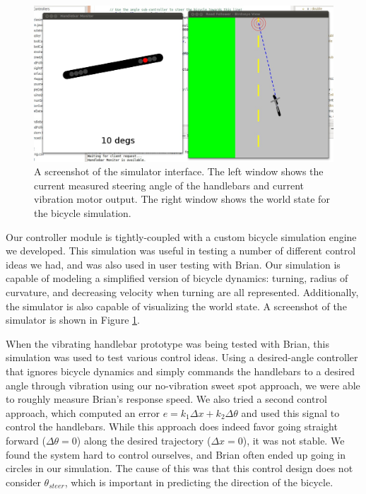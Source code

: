 \documentclass[aps,twocolumn,secnumarabic,balancelastpage,amsmath,amssymb,nofootinbib]{revtex4-1}
\begin{document}
\begin{figure}
\includegraphics[scale=0.18]{simulator_screenshot.jpg}
\caption{A screenshot of the simulator interface. The left window shows the current measured steering angle of the handlebars and current vibration motor output. The right window shows the world state for the bicycle simulation.}
\label{fig:Simulator}
\end{figure}

Our controller module is tightly-coupled with a custom bicycle simulation engine we developed. This simulation was useful in testing a number of different control ideas we had, and was also used in user testing with Brian. Our simulation is capable of modeling a simplified version of bicycle dynamics: turning, radius of curvature, and decreasing velocity when turning are all represented. Additionally, the simulator is also capable of visualizing the world state. A screenshot of the simulator is shown in Figure \ref{fig:Simulator}.

When the vibrating handlebar prototype was being tested with Brian, this simulation was used to test various control ideas. Using a desired-angle controller that ignores bicycle dynamics and simply commands the handlebars to a desired angle through vibration using our no-vibration sweet spot approach, we were able to roughly measure Brian's response speed. We also tried a second control approach, which computed an error $e = k_1 \Delta x + k_2 \Delta \theta$ and used this signal to control the handlebars. While this approach does indeed favor going straight forward ($\Delta \theta = 0$) along the desired trajectory ($\Delta x = 0$), it was not stable. We found the system hard to control ourselves, and Brian often ended up going in circles in our simulation. The cause of this was that this control design does not consider $\theta_{steer}$, which is important in predicting the direction of the bicycle.
\end{document}
